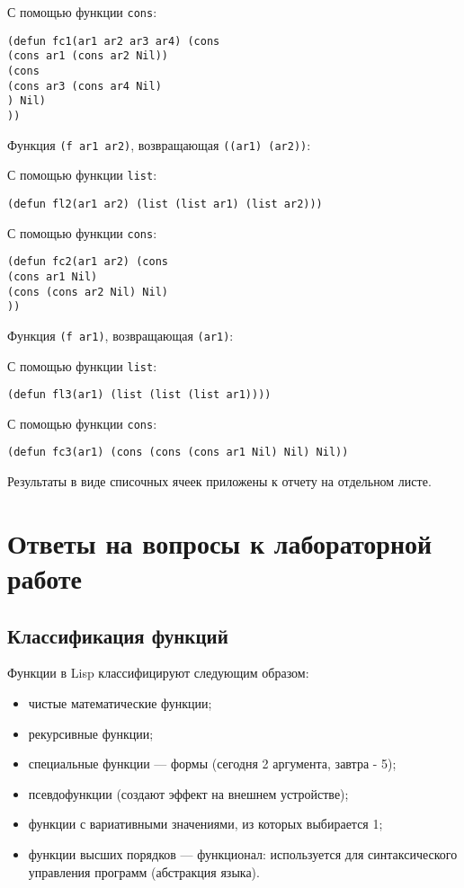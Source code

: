 С помощью функции \texttt{cons}:
\begin{lstlisting}
(defun fc1(ar1 ar2 ar3 ar4) (cons 
(cons ar1 (cons ar2 Nil)) 
(cons 
(cons ar3 (cons ar4 Nil)
) Nil)
))
\end{lstlisting}
\vspace{20mm}

Функция \texttt{(f ar1 ar2)}, возвращающая \texttt{((ar1) (ar2))}:

С помощью функции \texttt{list}:
\begin{lstlisting}
(defun fl2(ar1 ar2) (list (list ar1) (list ar2)))
\end{lstlisting}

С помощью функции \texttt{cons}:
\begin{lstlisting}
(defun fc2(ar1 ar2) (cons
(cons ar1 Nil)
(cons (cons ar2 Nil) Nil)
))
\end{lstlisting}
\vspace{20mm}

Функция \texttt{(f ar1)}, возвращающая \texttt{(ar1)}:

С помощью функции \texttt{list}:
\begin{lstlisting}
(defun fl3(ar1) (list (list (list ar1))))
\end{lstlisting}

С помощью функции \texttt{cons}:
\begin{lstlisting}
(defun fc3(ar1) (cons (cons (cons ar1 Nil) Nil) Nil))
\end{lstlisting}

Результаты в виде списочных ячеек приложены к отчету на отдельном листе.

\chapter{Ответы на вопросы к лабораторной работе}

\section{Классификация функций}

Функции в Lisp классифицируют следующим образом:

\begin{itemize}
    \item чистые математические функции;
    \item рекурсивные функции;
    \item специальные функции --- формы (сегодня 2 аргумента, завтра - 5);
    \item псевдофункции (создают эффект на внешнем устройстве);
    \item функции с вариативными значениями, из которых выбирается 1;
    \item функции высших порядков --- функционал: используется для синтаксического управления программ (абстракция языка).
\end{itemize}

